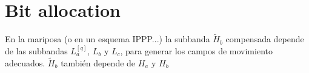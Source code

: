 
\section{Bit allocation}
En la mariposa (o en un esquema IPPP...) la subbanda $\tilde{H}_b$ compensada depende de las subbandas $L_a^{[q]}$, $L_b$ y $L_c$, para generar los campos de movimiento adecuados. $\tilde{H}_b$ también depende de $H_a$ y $H_b$ 

\begin{comment}

\subsection*{Example: Lossy compression of the MC $H$ subbands}
\begin{verbatim}
predictor=2

# You must be in the 'src' directory.
rm /tmp/*.png
cp ../sequences/stockholm/* /tmp

python3 -O MDWT.py -p /tmp/
python3 -O MCDWT.py -P $predictor -p /tmp/

quality=50
python3 ../tools/compress.py -i /tmp/LH001.png -o /tmp/LH001.png -q $quality
python3 ../tools/add_offset.py -i /tmp/LH001.png -o /tmp/LH001.png -f 32640
python3 ../tools/compress.py -i /tmp/HL001.png -o /tmp/HL001.png -q $quality
python3 ../tools/add_offset.py -i /tmp/HL001.png -o /tmp/HL001.png -f 32640
python3 ../tools/compress.py -i /tmp/HH001.png -o /tmp/HH001.png -q $quality
python3 ../tools/add_offset.py -i /tmp/HH001.png -o /tmp/HH001.png -f 32640

python3 ../tools/compress.py -i /tmp/LH002.png -o /tmp/LH002.png -q $quality
python3 ../tools/add_offset.py -i /tmp/LH002.png -o /tmp/LH002.png -f 32640
python3 ../tools/compress.py -i /tmp/HL002.png -o /tmp/HL002.png -q $quality
python3 ../tools/add_offset.py -i /tmp/HL002.png -o /tmp/HL002.png -f 32640
python3 ../tools/compress.py -i /tmp/HH002.png -o /tmp/HH002.png -q $quality
python3 ../tools/add_offset.py -i /tmp/HH002.png -o /tmp/HH002.png -f 32640

python3 ../tools/compress.py -i /tmp/LH003.png -o /tmp/LH003.png -q $quality
python3 ../tools/add_offset.py -i /tmp/LH003.png -o /tmp/LH003.png -f 32640
python3 ../tools/compress.py -i /tmp/HL003.png -o /tmp/HL003.png -q $quality
python3 ../tools/add_offset.py -i /tmp/HL003.png -o /tmp/HL003.png -f 32640
python3 ../tools/compress.py -i /tmp/HH003.png -o /tmp/HH003.png -q $quality
python3 ../tools/add_offset.py -i /tmp/HH003.png -o /tmp/HH003.png -f 32640


\end{comment}
